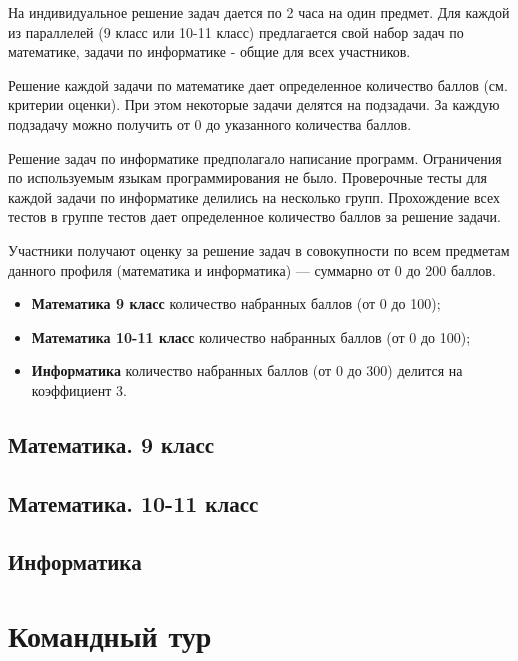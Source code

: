 \documentclass[a4paper,12pt,oneside]{book}
\begin{document}
На индивидуальное решение задач дается по 2 часа на один предмет.
Для каждой из параллелей (9 класс или 10-11 класс) предлагается свой
набор задач по математике, задачи по информатике - общие для всех
участников.

Решение каждой задачи по математике дает определенное количество
баллов (см. критерии оценки). При этом некоторые задачи делятся на
подзадачи. За каждую подзадачу можно получить от 0 до указанного
количества баллов.

Решение задач по информатике предполагало написание программ.
Ограничения по используемым языкам программирования не было.
Проверочные тесты для каждой задачи по информатике делились на
несколько групп. Прохождение всех тестов в группе тестов дает
определенное количество баллов за решение задачи.

Участники получают оценку за решение задач в совокупности по
всем предметам данного профиля (математика и информатика) ---
суммарно от 0 до 200 баллов.

\begin{itemize}
    \item {\bf Математика 9 класс} количество набранных баллов
    (от 0 до 100);
    \item {\bf Математика 10-11 класс} количество набранных баллов
    (от 0 до 100);
    \item {\bf Информатика} количество набранных баллов (от 0 до
    300) делится на коэффициент 3.
\end{itemize}

\section{Математика. 9 класс}


\section{Математика. 10-11 класс}


\section{Информатика}


\chapter{Командный тур}
\end{document}
